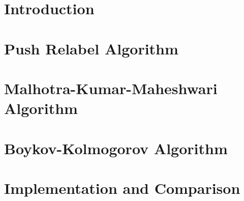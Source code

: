 \documentclass{report}
\author{}
\date{\today{}}
\begin{document}

\pagebreak

\tableofcontents

\pagebreak

\chapter{Introduction}

\chapter{Push Relabel Algorithm}

\chapter{Malhotra-Kumar-Maheshwari Algorithm}

\chapter{Boykov-Kolmogorov Algorithm}

\chapter{Implementation and Comparison}

\printbibliography
\end{document}
